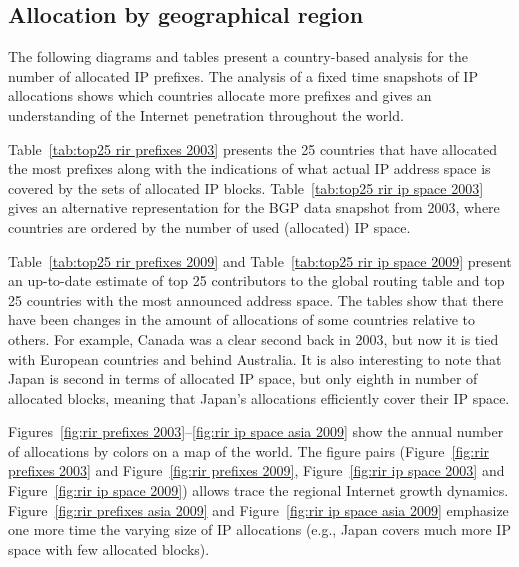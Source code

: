 \subsection{Allocation by geographical region}

The following diagrams and tables present a country-based analysis for the
number of allocated IP prefixes. The analysis of a fixed time snapshots of IP
allocations shows which countries allocate more prefixes and gives an
understanding of the Internet penetration throughout the world.

Table~\ref{tab:top25 rir prefixes 2003} presents the 25 countries that have
allocated the most prefixes along with the indications of what actual IP
address space is covered by the sets of allocated IP blocks.
Table~\ref{tab:top25 rir ip space 2003} gives an alternative representation
for the BGP data snapshot from 2003, where countries are ordered by the number
of used (allocated) IP space.

Table~\ref{tab:top25 rir prefixes 2009} and Table~\ref{tab:top25 rir ip space
2009} present an up-to-date estimate of top 25 contributors to the global
routing table and top 25 countries with the most announced address space. The
tables show that there have been changes in the amount of allocations of some
countries relative to others. For example, Canada was a clear second back in
2003, but now it is tied with European countries and behind Australia. It is
also interesting to note that Japan is second in terms of allocated IP space,
but only eighth in number of allocated blocks, meaning that Japan's
allocations efficiently cover their IP space.

Figures~\ref{fig:rir prefixes 2003}--\ref{fig:rir ip space asia 2009} show the
annual number of allocations by colors on a map of the world. The figure pairs
(Figure~\ref{fig:rir prefixes 2003} and Figure~\ref{fig:rir prefixes 2009},
Figure~\ref{fig:rir ip space 2003} and Figure~\ref{fig:rir ip space 2009})
allows trace the regional Internet growth dynamics. Figure~\ref{fig:rir
prefixes asia 2009} and Figure~\ref{fig:rir ip space asia 2009} emphasize one
more time the varying size of IP allocations (e.g., Japan covers much more IP
space with few allocated blocks).




